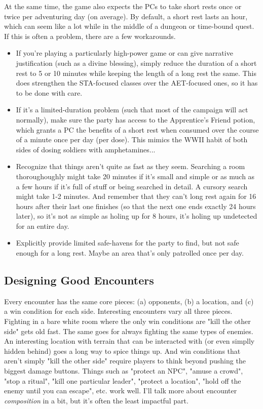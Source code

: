 \documentclass[10pt,twoside,openany,bg=none]{dndbook}
\begin{document}
At the same time, the game also expects the PCs to take short rests once or twice per adventuring day (on average). By default, a short rest lasts an hour, which can seem like a lot while in the middle of a dungeon or time-bound quest. If this is often a problem, there are a few workarounds.
\begin{itemize}
    \item If you're playing a particularly high-power game or can give narrative justification (such as a divine blessing), simply reduce the duration of a short rest to 5 or 10 minutes while keeping the length of a long rest the same. This does strengthen the STA-focused classes over the AET-focused ones, so it has to be done with care.
    \item If it's a limited-duration problem (such that most of the campaign will act normally), make sure the party has access to the Apprentice's Friend potion, which grants a PC the benefits of a short rest when consumed over the course of a minute once per day (per dose). This mimics the WWII habit of both sides of dosing soldiers with amphetamines...
    \item Recognize that things aren't quite as fast as they seem. Searching a room thoroughoughly might take 20 minutes if it's small and simple or as much as a few hours if it's full of stuff or being searched in detail. A cursory search might take 1-2 minutes. And remember that they can't long rest again for 16 hours after their last one finishes (so that the next one ends exactly 24 hours later), so it's not as simple as holing up for 8 hours, it's holing up undetected for an entire day.
    \item Explicitly provide limited safe-havens for the party to find, but not safe enough for a long rest. Maybe an area that's only patrolled once per day.
\end{itemize}

\subsection{Designing Good Encounters}
Every encounter has the same core pieces: (a) opponents, (b) a location, and (c) a win condition for each side. Interesting encounters vary all three pieces. Fighting in a bare white room where the only win conditions are "kill the other side" gets old fast. The same goes for always fighting the same types of enemies. An interesting location with terrain that can be interacted with (or even simplly hidden behind) goes a long way to spice things up. And win conditions that aren't simply "kill the other side" require players to think beyond pushing the biggest damage buttons. Things such as "protect an NPC", "amuse a crowd", "stop a ritual", "kill one particular leader", "protect a location", "hold off the enemy until you can escape", etc. work well. I'll talk more about encounter \textit{composition} in a bit, but it's often the least impactful part. 
\end{document}
